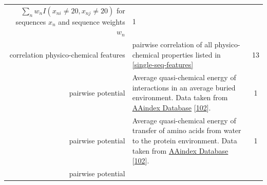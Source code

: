 \documentclass[12pt,a4paper,twoside]{book}
\theoremstyle{definition}
\theoremstyle{definition}
\theoremstyle{remark}
\begin{document}
\begin{longtable}[]{@{}rlc@{}}
\begin{minipage}[t]{0.50\columnwidth}
\(\sum_n w_n I(x_{ni} \! \neq \! 20, x_{nj} \! \neq \! 20)\) for
sequences \(x_n\) and sequence weights \(w_n\)\strut
\end{minipage} & \begin{minipage}[t]{0.18\columnwidth}\centering\strut
1\strut
\end{minipage}\tabularnewline
\begin{minipage}[t]{0.23\columnwidth}\raggedleft\strut
correlation physico-chemical features\strut
\end{minipage} & \begin{minipage}[t]{0.50\columnwidth}\raggedright\strut
pairwise correlation of all physico-chemical properties listed in
\ref{single-seq-features}\strut
\end{minipage} & \begin{minipage}[t]{0.18\columnwidth}\centering\strut
13\strut
\end{minipage}\tabularnewline
\begin{minipage}[t]{0.23\columnwidth}\raggedleft\strut
pairwise potential\strut
\end{minipage} & \begin{minipage}[t]{0.50\columnwidth}\raggedright\strut
Average quasi-chemical energy of interactions in an average buried
environment. Data taken from
\href{http://www.genome.jp/dbget-bin/www_bget?aaindex:MIYS990107}{AAindex
Database} {[}\protect\hyperlink{ref-Kawashima2008}{102}{]}.\strut
\end{minipage} & \begin{minipage}[t]{0.18\columnwidth}\centering\strut
1\strut
\end{minipage}\tabularnewline
\begin{minipage}[t]{0.23\columnwidth}\raggedleft\strut
pairwise potential\strut
\end{minipage} & \begin{minipage}[t]{0.50\columnwidth}\raggedright\strut
Average quasi-chemical energy of transfer of amino acids from water to
the protein environment. Data taken from
\href{http://www.genome.jp/dbget-bin/www_bget?aaindex:MIYS990106}{AAindex
Database} {[}\protect\hyperlink{ref-Kawashima2008}{102}{]}.\strut
\end{minipage} & \begin{minipage}[t]{0.18\columnwidth}\centering\strut
1\strut
\end{minipage}\tabularnewline
\begin{minipage}[t]{0.23\columnwidth}\raggedleft\strut
pairwise potential\strut
\end{minipage} & \begin{minipage}[t]{0.50\columnwidth}\raggedright\strut

\end{minipage}
\end{longtable}
\end{document}
